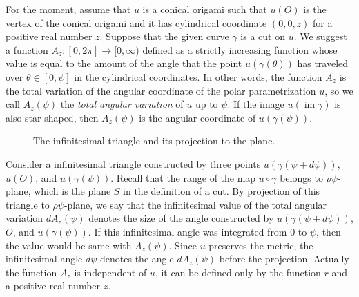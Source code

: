 \documentclass{amsart}
\theoremstyle{plain}
\theoremstyle{definition}
\theoremstyle{remark}
\DeclareMathOperator{\im}{im}
\begin{document}
For the moment, assume that $u$ is a conical origami such that $u(O)$ is the vertex of the conical origami and it has cylindrical coordinate $(0,0,z)$ for a positive real number $z$.
Suppose that the given curve $\gamma$ is a cut on $u$.
We suggest a function $A_z \colon [0,2\pi]\to[0,\infty)$ defined as a strictly increasing function whose value is equal to the amount of the angle that the point $u(\gamma(\theta))$ has traveled over $\theta\in[0,\psi]$ in the cylindrical coordinates.
In other words, the function $A_z$ is the total variation of the angular coordinate of the polar parametrization $u$, so we call $A_z(\psi)$ the \emph{total angular variation} of $u$ up to $\psi$.
If the image $u(\im \gamma)$ is also star-shaped, then $A_z(\psi)$ is the angular coordinate of $u(\gamma(\psi))$.

\begin{figure}%
\caption{The infinitesimal triangle and its projection to the plane.}
\end{figure}

Consider a infinitesimal triangle constructed by three points $u(\gamma(\psi+d\psi))$, $u(O)$, and $u(\gamma(\psi))$.
Recall that the range of the map $u\circ\gamma$ belongs to $\rho\psi$-plane, which is the plane $S$ in the definition of a cut.
By projection of this triangle to $\rho\psi$-plane, we say that the infinitesimal value of the total angular variation $dA_z(\psi)$ denotes the size of the angle constructed by $u(\gamma(\psi+d\psi))$, $O$, and $u(\gamma(\psi))$.
If this infinitesimal angle was integrated from $0$ to $\psi$, then the value would be same with $A_z(\psi)$.
Since $u$ preserves the metric, the infinitesimal angle $d\psi$ denotes the angle $dA_z(\psi)$ before the projection.
Actually the function $A_z$ is independent of $u$, it can be defined only by the function $r$ and a positive real number $z$.
\end{document}
